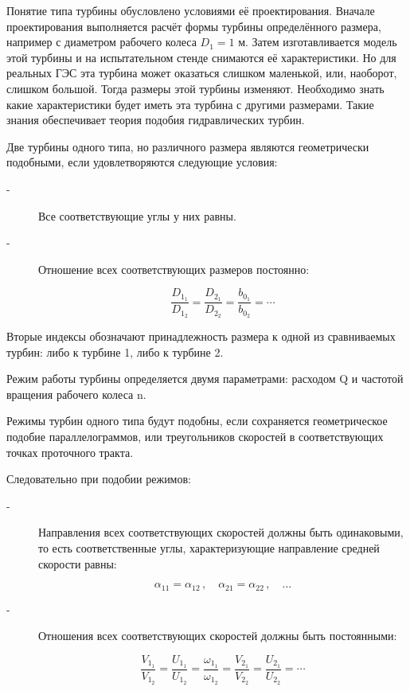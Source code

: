 Понятие типа турбины обусловлено условиями её проектирования. Вначале проектирования выполняется расчёт формы турбины определённого размера, например с диаметром рабочего колеса $D_1 = 1$ м. Затем изготавливается модель этой турбины и на испытательном стенде снимаются её характеристики. Но для реальных ГЭС эта турбина может оказаться слишком маленькой, или, наоборот, слишком большой. Тогда размеры этой турбины изменяют. Необходимо знать какие характеристики будет иметь эта турбина с другими размерами. Такие знания обеспечивает теория подобия гидравлических турбин.

\vspace{0.5cm}

Две турбины одного типа, но различного размера являются геометрически подобными, если удовлетворяются следующие условия:

\begin{description}
\item[-] Все соответствующие углы у них равны.
\item[-] Отношение всех соответствующих размеров постоянно:

\begin{equation}
\label{eq_fzj}
   \frac{D_{1_1}}{D_{1_2}} = \frac{D_{2_1}}{D_{2_2}} = \frac{b_{0_1}}{b_{0_2}} = \cdots
\end{equation}

\end{description}

Вторые индексы обозначают принадлежность размера к одной из сравниваемых турбин: либо к турбине 1, либо к турбине 2.

\vspace{0.5cm}

Режим работы турбины определяется двумя параметрами: расходом Q и частотой вращения рабочего колеса n.

Режимы турбин одного типа будут подобны, если сохраняется геометрическое подобие параллелограммов, или треугольников скоростей в соответствующих точках проточного тракта.

Следовательно при подобии режимов:

\begin{description}
\item[-] Направления всех соответствующих скоростей должны быть одинаковыми, то есть соответственные углы, характеризующие направление средней скорости равны:

\begin{equation}
\label{eq_fzh}
  \alpha_{1 1} = \alpha_{1 2} \, , \quad  \alpha_{2 1} = \alpha_{2 2} \, , \quad \dots 
\end{equation}

\item[-] Отношения всех соответствующих скоростей должны быть постоянными:

\begin{equation}
\label{eq_fzi}
   \frac{V_{1_1}}{V_{1_2}} = \frac{U_{1_1}}{U_{1_2}} = \frac{\omega_{1_1}}{\omega_{1_2}} = \frac{V_{2_1}}{V_{2_2}} = \frac{U_{2_1}}{U_{2_2}} = \cdots
\end{equation}

\end{description}

